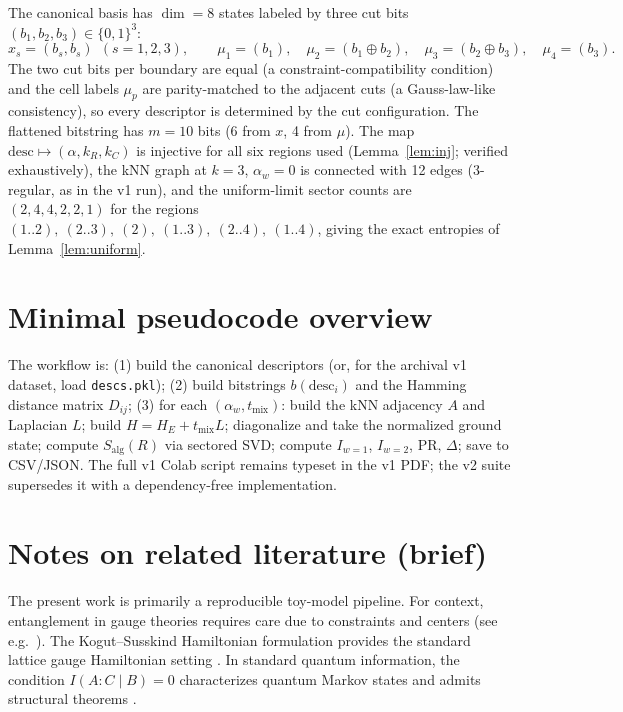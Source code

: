 \documentclass[11pt]{article}
\theoremstyle{remark}
\newcommand{\Salg}{S_{\mathrm{alg}}}
\begin{document}
The canonical basis has $\dim = 8$ states labeled by three cut bits
$(b_1, b_2, b_3) \in \{0,1\}^3$:
\[
x_s = (b_s, b_s) \ \ (s = 1, 2, 3), \qquad
\mu_1 = (b_1), \quad \mu_2 = (b_1 \oplus b_2), \quad
\mu_3 = (b_2 \oplus b_3), \quad \mu_4 = (b_3).
\]
The two cut bits per boundary are equal (a constraint-compatibility
condition) and the cell labels $\mu_p$ are parity-matched to the
adjacent cuts (a Gauss-law-like consistency), so every descriptor is
determined by the cut configuration. The flattened bitstring has $m =
10$ bits (6 from $x$, 4 from $\mu$). The map $\mathrm{desc} \mapsto
(\alpha, k_R, k_C)$ is injective for all six regions used
(Lemma~\ref{lem:inj}; verified exhaustively), the kNN graph at $k = 3$,
$\alpha_w = 0$ is connected with 12 edges (3-regular, as in the v1 run),
and the uniform-limit sector counts are $(2, 4, 4, 2, 2, 1)$ for the
regions $(1..2),\ (2..3),\ (2),\ (1..3),\ (2..4),\ (1..4)$, giving the
exact entropies of Lemma~\ref{lem:uniform}.

\section{Minimal pseudocode overview}

The workflow is: (1) build the canonical descriptors (or, for the
archival v1 dataset, load \texttt{descs.pkl}); (2) build bitstrings
$b(\mathrm{desc}_i)$ and the Hamming distance matrix $D_{ij}$; (3) for
each $(\alpha_w, t_{\mathrm{mix}})$: build the kNN adjacency $A$ and
Laplacian $L$; build $H = H_E + t_{\mathrm{mix}} L$; diagonalize and
take the normalized ground state; compute $\Salg(R)$ via sectored SVD;
compute $I_{w=1}$, $I_{w=2}$, PR, $\Delta$; save to CSV/JSON. The full
v1 Colab script remains typeset in the v1 PDF; the v2 suite supersedes
it with a dependency-free implementation.

\section{Notes on related literature (brief)}

The present work is primarily a reproducible toy-model pipeline. For
context, entanglement in gauge theories requires care due to constraints
and centers (see e.g.\ \cite{CHR}). The Kogut--Susskind Hamiltonian
formulation provides the standard lattice gauge Hamiltonian setting
\cite{KS}. In standard quantum information, the condition $I(A : C \mid
B) = 0$ characterizes quantum Markov states and admits structural
theorems \cite{HJPW}.
\end{document}
